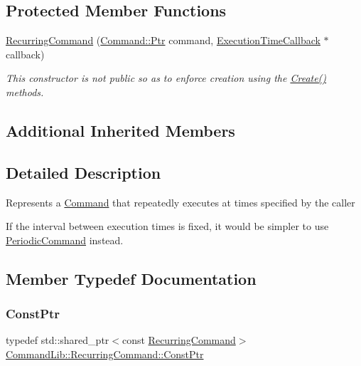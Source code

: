 \subsection*{Protected Member Functions}
\begin{DoxyCompactItemize}
\item 
\mbox{\hyperlink{class_command_lib_1_1_recurring_command_a46723429ffa56b961949931cc4e51e22}{Recurring\+Command}} (\mbox{\hyperlink{class_command_lib_1_1_command_a3b3e4f00144373299df5c6bb1acc319d}{Command\+::\+Ptr}} command, \mbox{\hyperlink{class_command_lib_1_1_recurring_command_1_1_execution_time_callback}{Execution\+Time\+Callback}} $\ast$callback)
\begin{DoxyCompactList}\small\item\em This constructor is not public so as to enforce creation using the \mbox{\hyperlink{class_command_lib_1_1_recurring_command_afac0e064cbce4cea8fe5d734367b7c3a}{Create()}} methods. \end{DoxyCompactList}\end{DoxyCompactItemize}
\subsection*{Additional Inherited Members}


\subsection{Detailed Description}
Represents a \mbox{\hyperlink{class_command_lib_1_1_command}{Command}} that repeatedly executes at times specified by the caller

If the interval between execution times is fixed, it would be simpler to use \mbox{\hyperlink{class_command_lib_1_1_periodic_command}{Periodic\+Command}} instead. 

\subsection{Member Typedef Documentation}
\mbox{\label{class_command_lib_1_1_recurring_command_a99bd5afbc77fa5d574fd0804146f0858}} 
\subsubsection{\texorpdfstring{Const\+Ptr}{ConstPtr}}
{\footnotesize\ttfamily typedef std\+::shared\+\_\+ptr$<$const \mbox{\hyperlink{class_command_lib_1_1_recurring_command}{Recurring\+Command}}$>$ \mbox{\hyperlink{class_command_lib_1_1_recurring_command_a99bd5afbc77fa5d574fd0804146f0858}{Command\+Lib\+::\+Recurring\+Command\+::\+Const\+Ptr}}}



